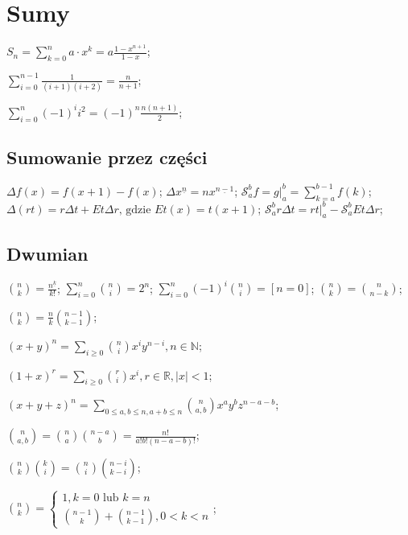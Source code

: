 \section{Sumy}

\entry
${S_n = \sum^{n}_{k = 0} a \cdot x^k} = {a \frac{1 - x^{n+1}}{1 - x}}$;

\entry
$\sum_{i=0}^{n-1}\frac{1}{(i+1)(i+2)} = \frac{n}{n+1}$;

\entry
$\sum_{i=0}^{n}(-1)^i i^2 = (-1)^n\frac{n(n+1)}{2}$;

\subsection{Sumowanie przez części}

\entry
${\Delta f(x) = f(x + 1) - f(x)}$;
\entry
${\Delta x^{\underline{n}}} = {n x^{\underline{n - 1}}}$;
\entry
${\mathcal{S}^{b}_{a} f}={g |^b_a} = {\sum^{b - 1}_{k = a} f(k)}$;
\entry
${\Delta (rt)} = {r \Delta t + E t \Delta r \text{, gdzie } E t(x)} =
  {t(x + 1)}$;
  \entry
${\mathcal{S}^{b}_{a} r \Delta t}= {r t |^b_a - \mathcal{S}^b_a E t \Delta r}$;

\subsection{Dwumian}

\entry
${\binom{n}{k} = {\frac{n^{\underline{k}}}{k!}}}$;
\entry
${\sum_{i = 0}^n \binom{n}{i} = 2^n}$;
\entry
${\sum_{i = 0}^{n} (-1)^i \binom{n}{i} = [ n = 0 ]}$;
\entry
$\binom{n}{k} = \binom{n}{n - k}$;

\entry
$\binom{n}{k} = \frac{n}{k} \binom{n - 1}{k - 1}$;

\entry
${(x + y)^n = \sum_{i \geq 0} \binom{n}{i} x^i y^{n-i}, n \in \mathbb{N}}$;

\entry
${(1 + x)^r = \sum_{i \geq 0} \binom{r}{i} x^i, r \in \mathbb{R}, |x| < 1}$;

\entry
$(x + y + z)^n =
  \sum_{0 \leq a, b \leq n, a+b \leq n} \binom{n}{a,b} x^a y^b z^{n-a-b}$;

\entry
$\binom{n}{a,b} = \binom{n}{a}\binom{n-a}{b} = \frac{n!}{a! b! (n - a - b)!}$;

\entry
$\binom{n}{k}\binom{k}{i} = \binom{n}{i}\binom{n-i}{k-i}$;

\entry
$\binom{n}{k} = \begin{cases}
    1, k = 0 \text{ lub } k = n \\
    \binom{n - 1}{k} + \binom{n - 1}{k - 1}, 0 < k < n
\end{cases}
$;

